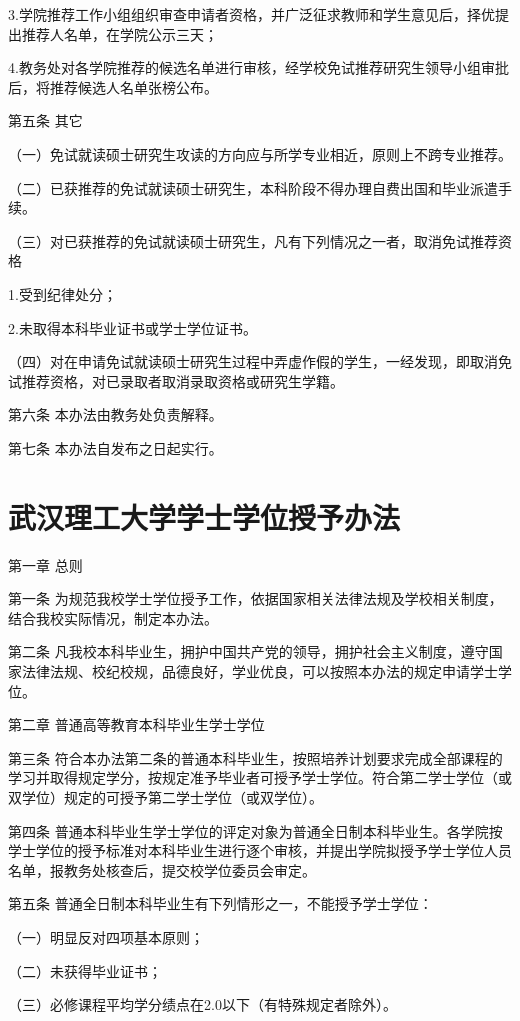\documentclass[UTF8,12pt,a4paper]{report}
\begin{document}
3.学院推荐工作小组组织审查申请者资格，并广泛征求教师和学生意见后，择优提出推荐人名单，在学院公示三天；

4.教务处对各学院推荐的候选名单进行审核，经学校免试推荐研究生领导小组审批后，将推荐候选人名单张榜公布。

第五条 其它

（一）免试就读硕士研究生攻读的方向应与所学专业相近，原则上不跨专业推荐。

（二）已获推荐的免试就读硕士研究生，本科阶段不得办理自费出国和毕业派遣手续。

（三）对已获推荐的免试就读硕士研究生，凡有下列情况之一者，取消免试推荐资格

1.受到纪律处分；

2.未取得本科毕业证书或学士学位证书。

（四）对在申请免试就读硕士研究生过程中弄虚作假的学生，一经发现，即取消免试推荐资格，对已录取者取消录取资格或研究生学籍。

第六条 本办法由教务处负责解释。

第七条 本办法自发布之日起实行。

\chapter{武汉理工大学学士学位授予办法}
第一章 总则

第一条  为规范我校学士学位授予工作，依据国家相关法律法规及学校相关制度，结合我校实际情况，制定本办法。

第二条  凡我校本科毕业生，拥护中国共产党的领导，拥护社会主义制度，遵守国家法律法规、校纪校规，品德良好，学业优良，可以按照本办法的规定申请学士学位。



第二章 普通高等教育本科毕业生学士学位

第三条  符合本办法第二条的普通本科毕业生，按照培养计划要求完成全部课程的学习并取得规定学分，按规定准予毕业者可授予学士学位。符合第二学士学位（或双学位）规定的可授予第二学士学位（或双学位）。

第四条  普通本科毕业生学士学位的评定对象为普通全日制本科毕业生。各学院按学士学位的授予标准对本科毕业生进行逐个审核，并提出学院拟授予学士学位人员名单，报教务处核查后，提交校学位委员会审定。

第五条  普通全日制本科毕业生有下列情形之一，不能授予学士学位：

（一）明显反对四项基本原则；

（二）未获得毕业证书；

（三）必修课程平均学分绩点在2.0以下（有特殊规定者除外）。　　
\end{document}

